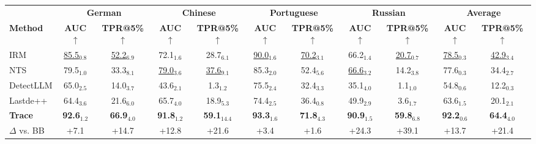 \begin{tabular}{lcccccccccc}
\toprule
 & \multicolumn{2}{c}{\textbf{German}} & \multicolumn{2}{c}{\textbf{Chinese}} & \multicolumn{2}{c}{\textbf{Portuguese}} & \multicolumn{2}{c}{\textbf{Russian}} & \multicolumn{2}{c}{\textbf{Average}}\\
\cmidrule(lr){2-3} \cmidrule(lr){4-5} \cmidrule(lr){6-7} \cmidrule(lr){8-9}
\textbf{Method} & \textbf{AUC $\uparrow$} & \textbf{TPR@5\% $\uparrow$} & \textbf{AUC $\uparrow$} & \textbf{TPR@5\% $\uparrow$} & \textbf{AUC $\uparrow$} & \textbf{TPR@5\% $\uparrow$} & \textbf{AUC $\uparrow$} & \textbf{TPR@5\% $\uparrow$} & \textbf{AUC $\uparrow$} & \textbf{TPR@5\% $\uparrow$} \\
\midrule
IRM & \cellcolor{orange!25}\underline{85.5$_{0.8}$} & \cellcolor{orange!25}\underline{52.2$_{6.9}$} & 72.1$_{1.6}$ & 28.7$_{6.1}$ & \cellcolor{orange!25}\underline{90.0$_{1.6}$} & \cellcolor{orange!25}\underline{70.2$_{3.1}$} & 66.2$_{1.4}$ & \cellcolor{orange!25}\underline{20.7$_{0.7}$} & \cellcolor{orange!25}\underline{78.5$_{0.3}$} & \cellcolor{orange!25}\underline{42.9$_{3.4}$} \\
NTS & 79.5$_{1.0}$ & 33.3$_{8.1}$ & \cellcolor{orange!25}\underline{79.0$_{3.6}$} & \cellcolor{orange!25}\underline{37.6$_{9.1}$} & 85.3$_{2.0}$ & 52.4$_{5.6}$ & \cellcolor{orange!25}\underline{66.6$_{3.2}$} & 14.2$_{3.8}$ & 77.6$_{0.3}$ & 34.4$_{2.7}$ \\
DetectLLM & 65.0$_{2.5}$ & 14.0$_{3.7}$ & 43.6$_{2.1}$ & 1.3$_{1.2}$ & 75.5$_{2.4}$ & 32.4$_{3.3}$ & 35.1$_{4.0}$ & 1.1$_{1.0}$ & 54.8$_{0.6}$ & 12.2$_{0.3}$ \\
Lastde++ & 64.4$_{3.6}$ & 21.6$_{6.0}$ & 65.7$_{4.0}$ & 18.9$_{5.3}$ & 74.4$_{2.5}$ & 36.4$_{0.8}$ & 49.9$_{2.9}$ & 3.6$_{1.7}$ & 63.6$_{1.5}$ & 20.1$_{2.1}$ \\
\midrule
\textbf{Trace} & \cellcolor{cyan!25}\textbf{92.6$_{1.2}$} & \cellcolor{cyan!25}\textbf{66.9$_{4.0}$} & \cellcolor{cyan!25}\textbf{91.8$_{1.2}$} & \cellcolor{cyan!25}\textbf{59.1$_{14.4}$} & \cellcolor{cyan!25}\textbf{93.3$_{1.6}$} & \cellcolor{cyan!25}\textbf{71.8$_{4.3}$} & \cellcolor{cyan!25}\textbf{90.9$_{1.5}$} & \cellcolor{cyan!25}\textbf{59.8$_{6.8}$} & \cellcolor{cyan!25}\textbf{92.2$_{0.6}$} & \cellcolor{cyan!25}\textbf{64.4$_{4.0}$} \\
$\Delta$ vs. BB & \textcolor{green!60!black}{+7.1} & \textcolor{green!60!black}{+14.7} & \textcolor{green!60!black}{+12.8} & \textcolor{green!60!black}{+21.6} & \textcolor{green!60!black}{+3.4} & \textcolor{green!60!black}{+1.6} & \textcolor{green!60!black}{+24.3} & \textcolor{green!60!black}{+39.1} & \textcolor{green!60!black}{+13.7} & \textcolor{green!60!black}{+21.4} \\
\bottomrule
\end{tabular}
